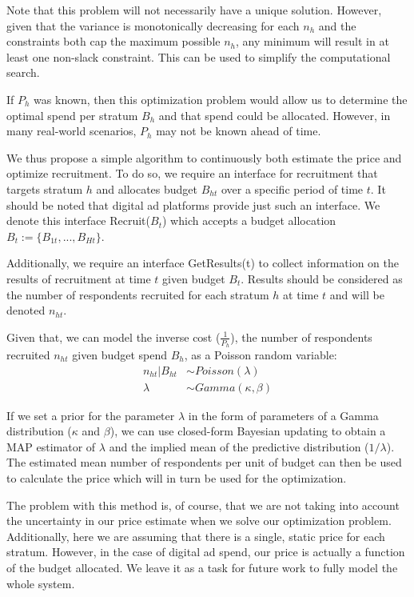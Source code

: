 \documentclass[a4paper,12pt]{article}
\theoremstyle{proposition}
\begin{document}
Note that this problem will not necessarily have a unique solution. However, given that the variance is monotonically decreasing for each $n_h$ and the constraints both cap the maximum possible $n_h$, any minimum will result in at least one non-slack constraint. This can be used to simplify the computational search.

If $P_h$ was known, then this optimization problem would allow us to determine the optimal spend per stratum $B_h$ and that spend could be allocated. However, in many real-world scenarios, $P_h$ may not be known ahead of time.

We thus propose a simple algorithm to continuously both estimate the price and optimize recruitment. To do so, we require an interface for recruitment that targets stratum $h$ and allocates budget $B_{ht}$ over a specific period of time $t$. It should be noted that digital ad platforms provide just such an interface. We denote this interface Recruit($B_{t}$) which accepts a budget allocation $B_t := \{B_{1t},...,B_{Ht}\}$.

Additionally, we require an interface GetResults(t) to collect information on the results of recruitment at time $t$ given budget $B_t$. Results should be considered as the number of respondents recruited for each stratum $h$ at time $t$ and will be denoted $n_{ht}$.

Given that, we can model the inverse cost ($\frac{1}{P_h}$), the number of respondents recruited $n_{ht}$ given budget spend $B_h$, as a Poisson random variable:
%
\begin{align*}
n_{ht} | B_{ht} &\sim Poisson(\lambda) \\
\lambda &\sim Gamma(\kappa, \beta)
\end{align*}

If we set a prior for the parameter $\lambda$ in the form of parameters of a Gamma distribution ($\kappa$ and $\beta$), we can use closed-form Bayesian updating to obtain a MAP estimator of $\lambda$ and the implied mean of the predictive distribution ($ 1 / \lambda$). The estimated mean number of respondents per unit of budget can then be used to calculate the price which will in turn be used for the optimization.

The problem with this method is, of course, that we are not taking into account the uncertainty in our price estimate when we solve our optimization problem. Additionally, here we are assuming that there is a single, static price for each stratum. However, in the case of digital ad spend, our price is actually a function of the budget allocated. We leave it as a task for future work to fully model the whole system.
\end{document}
